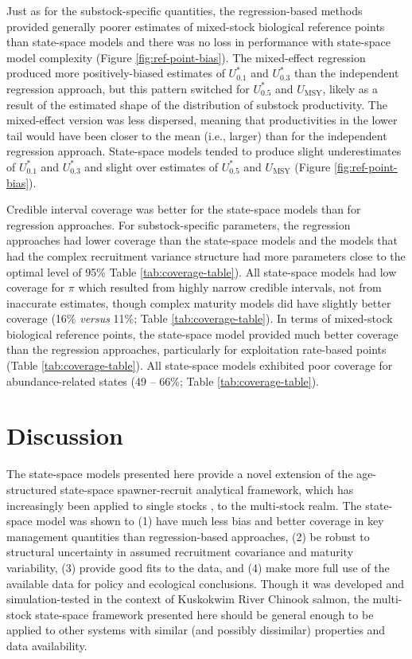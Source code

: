 \documentclass[12pt,]{book}
\theoremstyle{definition}
\theoremstyle{definition}
\theoremstyle{definition}
\theoremstyle{remark}
\begin{document}
Just as for the substock-specific quantities, the regression-based
methods provided generally poorer estimates of mixed-stock biological
reference points than state-space models and there was no loss in
performance with state-space model complexity (Figure
\ref{fig:ref-point-bias}). The mixed-effect regression produced more
positively-biased estimates of \(U^*_{0.1}\) and \(U^*_{0.3}\) than the
independent regression approach, but this pattern switched for
\(U^*_{0.5}\) and \(U_{\text{MSY}}\), likely as a result of the
estimated shape of the distribution of substock productivity. The
mixed-effect version was less dispersed, meaning that productivities in
the lower tail would have been closer to the mean (i.e., larger) than
for the independent regression approach. State-space models tended to
produce slight underestimates of \(U^*_{0.1}\) and \(U^*_{0.3}\) and
slight over estimates of \(U^*_{0.5}\) and \(U_{\text{MSY}}\) (Figure
\ref{fig:ref-point-bias}).

Credible interval coverage was better for the state-space models than
for regression approaches. For substock-specific parameters, the
regression approaches had lower coverage than the state-space models and
the models that had the complex recruitment variance structure had more
parameters close to the optimal level of 95\% Table
\ref{tab:coverage-table}). All state-space models had low coverage for
\(\pi\) which resulted from highly narrow credible intervals, not from
inaccurate estimates, though complex maturity models did have slightly
better coverage (16\% \emph{versus} 11\%; Table
\ref{tab:coverage-table}). In terms of mixed-stock biological reference
points, the state-space model provided much better coverage than the
regression approaches, particularly for exploitation rate-based points
(Table \ref{tab:coverage-table}). All state-space models exhibited poor
coverage for abundance-related states (49 -- 66\%; Table
\ref{tab:coverage-table}).

\section{Discussion}\label{discussion-2}

\noindent
The state-space models presented here provide a novel extension of the
age-structured state-space spawner-recruit analytical framework, which
has increasingly been applied to single stocks
\citep[e.g.,][]{su-peterman-2012, hamazaki-etal-2012, fleischman-etal-2013, staton-etal-2017-intseq, defilippo-etal-2018},
to the multi-stock realm. The state-space model was shown to (1) have
much less bias and better coverage in key management quantities than
regression-based approaches, (2) be robust to structural uncertainty in
assumed recruitment covariance and maturity variability, (3) provide
good fits to the data, and (4) make more full use of the available data
for policy and ecological conclusions. Though it was developed and
simulation-tested in the context of Kuskokwim River Chinook salmon, the
multi-stock state-space framework presented here should be general
enough to be applied to other systems with similar (and possibly
dissimilar) properties and data availability.
\end{document}
